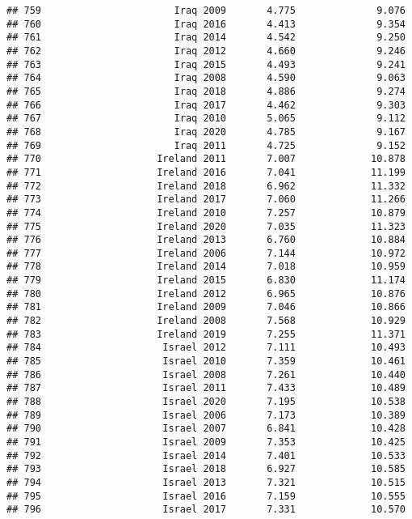 \documentclass[
]{article}
\begin{document}
\begin{verbatim}
## 759                       Iraq 2009       4.775              9.076
## 760                       Iraq 2016       4.413              9.354
## 761                       Iraq 2014       4.542              9.250
## 762                       Iraq 2012       4.660              9.246
## 763                       Iraq 2015       4.493              9.241
## 764                       Iraq 2008       4.590              9.063
## 765                       Iraq 2018       4.886              9.274
## 766                       Iraq 2017       4.462              9.303
## 767                       Iraq 2010       5.065              9.112
## 768                       Iraq 2020       4.785              9.167
## 769                       Iraq 2011       4.725              9.152
## 770                    Ireland 2011       7.007             10.878
## 771                    Ireland 2016       7.041             11.199
## 772                    Ireland 2018       6.962             11.332
## 773                    Ireland 2017       7.060             11.266
## 774                    Ireland 2010       7.257             10.879
## 775                    Ireland 2020       7.035             11.323
## 776                    Ireland 2013       6.760             10.884
## 777                    Ireland 2006       7.144             10.972
## 778                    Ireland 2014       7.018             10.959
## 779                    Ireland 2015       6.830             11.174
## 780                    Ireland 2012       6.965             10.876
## 781                    Ireland 2009       7.046             10.866
## 782                    Ireland 2008       7.568             10.929
## 783                    Ireland 2019       7.255             11.371
## 784                     Israel 2012       7.111             10.493
## 785                     Israel 2010       7.359             10.461
## 786                     Israel 2008       7.261             10.440
## 787                     Israel 2011       7.433             10.489
## 788                     Israel 2020       7.195             10.538
## 789                     Israel 2006       7.173             10.389
## 790                     Israel 2007       6.841             10.428
## 791                     Israel 2009       7.353             10.425
## 792                     Israel 2014       7.401             10.533
## 793                     Israel 2018       6.927             10.585
## 794                     Israel 2013       7.321             10.515
## 795                     Israel 2016       7.159             10.555
## 796                     Israel 2017       7.331             10.570

\end{verbatim}
\end{document}
